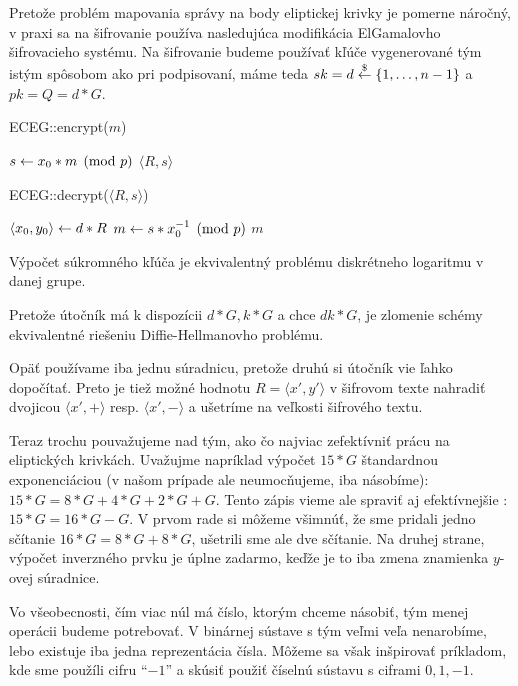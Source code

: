 Pretože problém mapovania správy na body eliptickej krivky je pomerne
náročný, v praxi sa na šifrovanie používa nasledujúca modifikácia
ElGamalovho šifrovacieho systému. Na šifrovanie budeme používať
kľúče vygenerované tým istým spôsobom ako pri podpisovaní, máme teda
$sk=d \overset{\$}{\leftarrow} \{1,\dots,n-1\}$ a $pk=Q=d*G$.

\begin{procedure}[H]
    \caption{ECEG::encrypt($m$)}
    $ s \leftarrow x_0 * m \pmod{p}$ \;
    \Return $\langle R, s \rangle$ \;
\end{procedure}

\begin{procedure}[H]
    \caption{ECEG::decrypt($\langle R, s\rangle$)}
    $\langle x_0, y_0 \rangle \leftarrow d*R$ \;
    $ m \leftarrow  s * x_0^{-1} \pmod{p}$ \;
    \Return $m$ \;
\end{procedure}

\begin{poznamka}
    Výpočet súkromného kľúča je ekvivalentný problému diskrétneho
    logaritmu v danej grupe.
\end{poznamka}
\begin{poznamka}
    Pretože útočník má k dispozícii $d*G, k*G$ a chce $dk*G$, je
    zlomenie schémy ekvivalentné riešeniu Diffie-Hellmanovho problému.
\end{poznamka}
\begin{poznamka}
    Opäť používame iba jednu súradnicu, pretože druhú si útočník vie
    ľahko dopočítať. Preto je tiež možné hodnotu
    $R = \langle x', y' \rangle$ v šifrovom texte nahradiť dvojicou
    $\langle x', + \rangle$ resp. $\langle x', - \rangle$
    a ušetríme na veľkosti šifrového textu.
\end{poznamka}

Teraz trochu pouvažujeme nad tým, ako čo najviac zefektívniť prácu na
eliptických krivkách. Uvažujme napríklad výpočet $15*G$ štandardnou
exponenciáciou (v našom prípade ale neumocňujeme, iba násobíme):
$15*G = 8*G + 4*G + 2*G + G$. Tento zápis vieme ale spraviť aj
efektívnejšie : $15*G = 16*G - G$. V prvom rade si môžeme všimnúť, že
sme pridali jedno sčítanie $16*G = 8*G + 8*G$, ušetrili sme ale dve
sčítanie. Na druhej strane, výpočet inverzného prvku je úplne zadarmo,
keďže je to iba zmena znamienka $y$-ovej súradnice.

Vo všeobecnosti, čím viac núl má číslo, ktorým chceme
násobiť, tým menej operácii budeme potrebovať. V binárnej sústave s
tým veľmi veľa nenarobíme, lebo existuje iba jedna reprezentácia
čísla. Môžeme sa však inšpirovať príkladom, kde sme použíli cifru
``$-1$'' a skúsiť použiť číselnú sústavu s ciframi $0,1,-1$.

